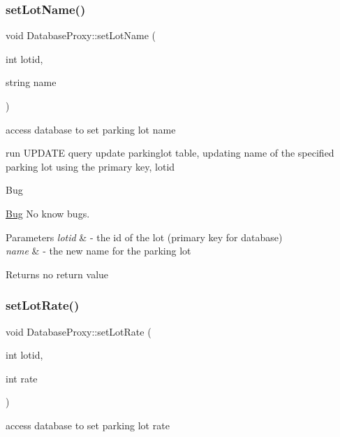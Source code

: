\subsubsection{\texorpdfstring{set\+Lot\+Name()}{setLotName()}}
{\footnotesize\ttfamily void Database\+Proxy\+::set\+Lot\+Name (\begin{DoxyParamCaption}\item[{int}]{lotid,  }\item[{string}]{name }\end{DoxyParamCaption})}



access database to set parking lot name 

run U\+P\+D\+A\+TE query update parkinglot table, updating name of the specified parking lot using the primary key, lotid

\begin{DoxyRefDesc}{Bug}
\item[\mbox{\hyperlink{bug__bug000019}{Bug}}]No know bugs. \end{DoxyRefDesc}

\begin{DoxyParams}{Parameters}
{\em lotid} & -\/ the id of the lot (primary key for database) \\
\hline
{\em name} & -\/ the new name for the parking lot \\
\hline
\end{DoxyParams}
\begin{DoxyReturn}{Returns}
no return value 
\end{DoxyReturn}
\mbox{\label{class_database_proxy_a68aa4847e1dc937349200241722d411c}} 
\subsubsection{\texorpdfstring{set\+Lot\+Rate()}{setLotRate()}}
{\footnotesize\ttfamily void Database\+Proxy\+::set\+Lot\+Rate (\begin{DoxyParamCaption}\item[{int}]{lotid,  }\item[{int}]{rate }\end{DoxyParamCaption})}



access database to set parking lot rate 

